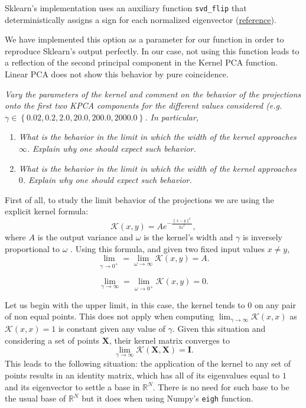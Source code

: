 \documentclass[11pt]{article}
\begin{document}
Sklearn's implementation uses an auxiliary function \texttt{svd\_flip} that deterministically assigns a sign for each normalized eigenvector (\href{https://github.com/scikit-learn/scikit-learn/blob/15c2c72e27c6ea18566f4e786506c7a3aef8a5de/sklearn/utils/extmath.py#L504}{reference}).

We have implemented this option as a parameter for our function in order to reproduce Sklearn's output perfectly. In our case, not using this function leads to a reflection of the second principal component in the Kernel PCA function. Linear PCA does not show this behavior by pure coincidence.

\emph{Vary the parameters of the kernel and comment on the behavior of the projections onto the first two KPCA components for the different values considered (e.g. $\gamma \in \left\{0.02, 0.2, 2.0, 20.0, 200.0, 2000.0\right\}$. In particular,}
\begin{enumerate}
    \item \emph{What is the behavior in the limit in which the width of the kernel approaches $\infty$. Explain why one should expect such behavior.}
    \item \emph{What is the behavior in the limit in which the width of the kernel approaches $0$. Explain why one should expect such behavior.}
\end{enumerate}

First of all, to study the limit behavior of the projections we are using the explicit kernel formula:
\[
     \mathcal{K}(x, y) = Ae^{-\frac{\|x-y\|^{2}}{2 \omega^2}},
\]
where \( A \) is the output variance and \( \omega \) is the kernel's width and \( \gamma \) is inversely proportional to \( \omega \) . Using this formula, and given two fixed input values \( x \neq y \),
\[
     \lim_{\gamma \to 0^{+}} = \lim_{\omega \to \infty} \mathcal{K}(x,y) = A.
\]

\[
     \lim_{\gamma \to \infty} = \lim_{\omega \to 0^{+}} \mathcal{K}(x,y) = 0.
\]

Let us begin with the upper limit, in this case, the kernel tends to \( 0 \) on any pair of non equal points. This does not apply when computing \( \lim_{\gamma \to \infty} \mathcal{K}(x,x) \) as \( \mathcal{K}(x,x) = 1 \) is constant given any value of \( \gamma \). Given this situation and considering a set of points \( \bm{X} \), their kernel matrix converges to
\[
      \lim_{\gamma \to \infty} \mathcal{K}(\bm{X}, \bm{X}) = \bm{I}.
\]
This leads to the following situation: the application of the kernel to any set of points results in an identity matrix, which has all of its eigenvalues equal to \( 1 \) and its eigenvector to settle a base in \( \mathbb{R}^N \). There is no need for such base to be the usual base of \( \mathbb{R}^N \) but it does when using Numpy's \texttt{eigh} function.   
\end{document}
